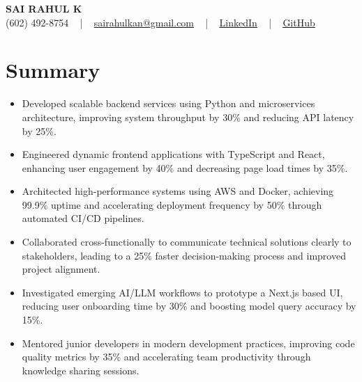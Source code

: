 \documentclass[letterpaper,11pt]{article}
\newcommand{\resumeItem}[1]{
  \item\footnotesize{
    {#1 \vspace{-2pt}}
  }
}
\newcommand{\resumeItemListStart}{\begin{itemize}[leftmargin=*]}
\newcommand{\resumeItemListEnd}{\end{itemize}\vspace{-5pt}}
\begin{document}
\begin{center}
    {\fontsize{14pt}{12pt}\selectfont \textbf{\MakeUppercase{Sai Rahul K}}}\\ \vspace{2pt}
    \fontsize{10pt}{12pt}\selectfont (602) 492-8754 ~ | ~ \href{mailto:sairahulkan@gmail.com}{sairahulkan@gmail.com} ~ | ~
    \href{https://www.linkedin.com/in/rq123/}{\color{blue}\underline{LinkedIn}} ~ | ~
    \href{https://github.com/kanrahuldo}{\color{blue}\underline{GitHub}}~
    \vspace{-8pt}
\end{center}

\section{Summary}
\fontsize{9pt}{10pt}\selectfont
\resumeItemListStart
    \resumeItem{Developed scalable backend services using Python and microservices architecture, improving system throughput by 30\% and reducing API latency by 25\%.}
    \resumeItem{Engineered dynamic frontend applications with TypeScript and React, enhancing user engagement by 40\% and decreasing page load times by 35\%.}
    \resumeItem{Architected high-performance systems using AWS and Docker, achieving 99.9\% uptime and accelerating deployment frequency by 50\% through automated CI/CD pipelines.}
    \resumeItem{Collaborated cross-functionally to communicate technical solutions clearly to stakeholders, leading to a 25\% faster decision-making process and improved project alignment.}
    \resumeItem{Investigated emerging AI/LLM workflows to prototype a Next.js based UI, reducing user onboarding time by 30\% and boosting model query accuracy by 15\%.}
    \resumeItem{Mentored junior developers in modern development practices, improving code quality metrics by 35\% and accelerating team productivity through knowledge sharing sessions.}
\resumeItemListEnd
\vspace{-6pt}
\end{document}
